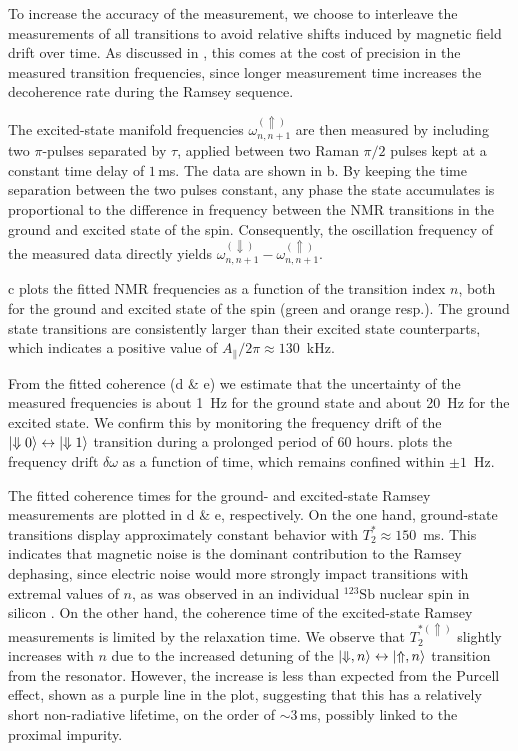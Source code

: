To increase the accuracy of the measurement, we choose to interleave the measurements of all transitions to avoid relative shifts induced by magnetic field drift over time. As discussed in , this comes at the cost of precision in the measured transition frequencies, since longer measurement time increases the decoherence rate during the Ramsey sequence.

The excited-state manifold frequencies $\omega^{(\Uparrow)}_{n,n+1}$ are then measured by including two \Er $\pi$-pulses separated by $\tau$, applied between two Raman $\pi/2$ pulses kept at a constant time delay of $1$\,ms. The data are shown in b. By keeping the time separation between the two \Nb pulses constant, any phase the state accumulates is proportional to the difference in frequency between the NMR transitions in the ground and excited state of the \Er spin. Consequently, the oscillation frequency of the measured data directly yields $\omega^{(\Downarrow)}_{n,n+1}-\omega^{(\Uparrow)}_{n,n+1}$. 

c plots the fitted NMR frequencies as a function of the transition index $n$, both for the ground and excited state of the \Er spin (green and orange resp.). The ground state transitions are consistently larger than their excited state counterparts, which indicates a positive value of $A_\parallel/2\pi\approx130$~kHz. 

From the fitted coherence (d \& e) we estimate that the uncertainty of the measured frequencies is about 1~Hz for the ground state and about 20~Hz for the excited state. We confirm this by monitoring the frequency drift of the $\ket{\Downarrow 0} \leftrightarrow \ket{\Downarrow 1}$ transition during a prolonged period of 60 hours.  plots the frequency drift $\delta \omega$ as a function of time, which remains confined within $\pm1$~Hz.

The fitted coherence times for the ground- and excited-state Ramsey measurements are plotted in d \& e, respectively. On the one hand, ground-state transitions display approximately constant behavior with $T_2^*\approx150$~ms. This indicates that magnetic noise is the dominant contribution to the Ramsey dephasing, since electric noise would more strongly impact transitions with extremal values of $n$, as was observed in an individual $^{123}\mathrm{Sb}$ nuclear spin in silicon . On the other hand, the coherence time of the excited-state Ramsey measurements is limited by the \Er relaxation time. We observe that $T_2^{*(\Uparrow)}$ slightly increases with $n$ due to the increased detuning of the $\ket{\Downarrow,n} \leftrightarrow \ket{\Uparrow,n}$ transition from the resonator. However, the increase is less than expected from the Purcell effect, shown as a purple line in the plot, suggesting that this \Er has a relatively short non-radiative lifetime, on the order of $\sim 3$\,ms, possibly linked to the proximal \Nb impurity. 

